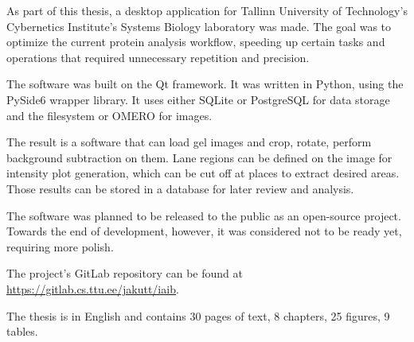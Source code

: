 As part of this thesis, a desktop application for Tallinn University of Technology's Cybernetics Institute's Systems Biology laboratory was made. The goal was to optimize the current protein analysis workflow, speeding up certain tasks and operations that required unnecessary repetition and precision.

The software was built on the Qt framework. It was written in Python, using the PySide6 wrapper library. It uses either SQLite or PostgreSQL for data storage and the filesystem or OMERO for images. 

The result is a software that can load gel images and crop, rotate, perform background subtraction on them. Lane regions can be defined on the image for intensity plot generation, which can be cut off at places to extract desired areas. Those results can be stored in a database for later review and analysis.

The software was planned to be released to the public as an open-source project. Towards the end of development, however, it was considered not to be ready yet, requiring more polish.

The project's GitLab repository can be found at \url{https://gitlab.cs.ttu.ee/jakutt/iaib}.

The thesis is in English and contains 30 pages of text, 8 chapters, 25 figures, 9 tables.
